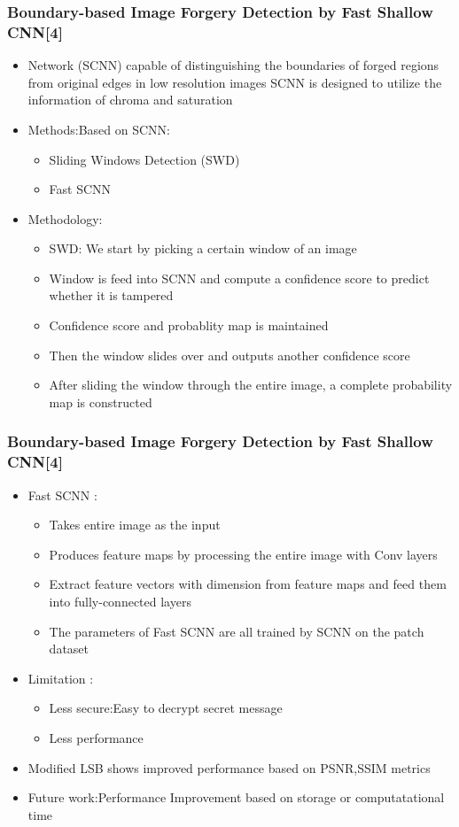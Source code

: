 \documentclass{beamer} %
\theoremstyle{definition} %
\begin{document}
\begin{frame}
\frametitle{Boundary-based Image Forgery Detection by Fast Shallow CNN[4]   }
\begin{itemize}
	\item{ Network (SCNN) capable of distinguishing the boundaries of
		forged regions from original edges in low resolution images 
		SCNN is designed to utilize the information of chroma and
		saturation  }
	\item{Methods:Based on SCNN:}
	\begin{itemize}
		\item Sliding Windows Detection (SWD) 
		\item Fast SCNN 
	\end{itemize}
	\item {Methodology:}
	\begin{itemize}
		\item{SWD: We start by picking a certain window of an image}
		\item Window is feed into SCNN and compute a confidence score to predict whether it is tampered 
		\item Confidence score and probablity map is maintained   
		\item Then the window slides over and outputs another confidence score   \item After sliding the window through the entire image, a complete probability map is constructed 
    \end{itemize}
\end{itemize}
\end{frame}

\begin{frame}
 \frametitle{Boundary-based Image Forgery Detection by Fast Shallow CNN[4] }
 \begin{itemize}
       \item{Fast SCNN :}
       \begin{itemize}
       	\item Takes entire image as the input  
       	\item Produces feature maps by processing the entire image
			with Conv layers 
		\item Extract feature vectors with dimension from feature maps and feed them into fully-connected layers  
		\item The parameters of Fast SCNN are all trained by SCNN on
			the patch dataset 
		\end{itemize}
	\end{itemize}
\begin{itemize}
	\item{Limitation :}
	\begin{itemize}
		\item {Less secure:Easy to decrypt secret message }
		\item {Less performance  }
	\end{itemize}
	\item{Modified LSB shows improved performance based on PSNR,SSIM metrics  } 
	\item{Future work:Performance Improvement based on storage or computatational time }
\end{itemize}
\end{frame}
\end{document}
